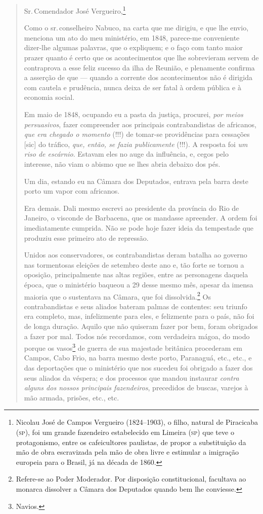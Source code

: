 \begin{quote}\label{vergueiro}
\noindent{}Sr.\,Comendador José Vergueiro,\footnote{Nicolau José de Campos 
  Vergueiro (1824--1903), o filho, natural de Piracicaba (\textsc{sp}), foi um
  grande fazendeiro estabelecido em Limeira (\textsc{sp}) que teve o
  protagonismo, entre os cafeicultores paulistas, de propor a
  substituição da mão de obra escravizada pela mão de obra livre e
  estimular a imigração europeia para o Brasil, já na década de 1860.}

Como o sr.\,conselheiro Nabuco, na carta que me dirigiu, e que lhe envio,
menciona um ato do meu ministério, em 1848, parece-me conveniente
dizer-lhe algumas palavras, que o expliquem; e o faço com tanto maior
prazer quanto é certo que os acontecimentos que lhe sobrevieram servem
de contraprova a esse feliz sucesso da ilha de Reunião, e plenamente
confirma a asserção de que --- quando a corrente dos acontecimentos não
é dirigida com cautela e prudência, nunca deixa de ser fatal à ordem
pública e à economia social.

Em maio de 1848, ocupando eu a pasta da justiça, procurei, \emph{por
meios persuasivos}, fazer compreender aos principais contrabandistas de
africanos, \emph{que era chegado o momento} (!!!) de tomar-se
providências para cessações {[}sic{]} do tráfico, \emph{que, então, se
fazia publicamente} (!!!). A resposta foi \textit{um riso de escárnio}. Estavam
eles no auge da influência, e, cegos pelo interesse, não viam o abismo
que se lhes abria debaixo dos pés.

Um dia, estando eu na Câmara dos Deputados, entrava pela barra deste
porto um vapor com africanos.

Era demais. Dali mesmo escrevi ao presidente da província do Rio de
Janeiro, o visconde de Barbacena, que os mandasse apreender. A ordem foi
imediatamente cumprida. Não se pode hoje fazer ideia da tempestade que
produziu esse primeiro ato de repressão.

Unidos aos conservadores, os contrabandistas deram batalha ao governo
nas tormentosas eleições de setembro deste ano e, tão forte se tornou a
oposição, principalmente nas altas regiões, entre as personagens daquela
época, que o ministério baqueou a 29 desse mesmo mês, apesar da imensa
maioria que o sustentava na Câmara, que foi dissolvida.\footnote{
  Refere-se ao Poder Moderador. Por disposição constitucional,
  facultava ao monarca dissolver a Câmara dos Deputados quando bem lhe
  conviesse.} Os contrabandistas e seus aliados bateram palmas de
contentes: seu triunfo era completo, mas, infelizmente para eles, e
felizmente para o país, não foi de longa duração. Aquilo que não
quiseram fazer por bem, foram obrigados a fazer por mal. Todos nós
recordamos, com verdadeira mágoa, do modo porque os vasos\footnote{
  Navios.} de guerra de sua majestade britânica procederam em Campos,
Cabo Frio, na barra mesmo deste porto, Paranaguá, etc., etc., e das
deportações que o ministério que nos sucedeu foi obrigado a fazer dos
seus aliados da véspera; e dos processos que mandou instaurar
\emph{contra alguns dos nossos principais fazendeiros}, precedidos de
buscas, varejos à mão armada, prisões, etc., etc.


\end{quote}
